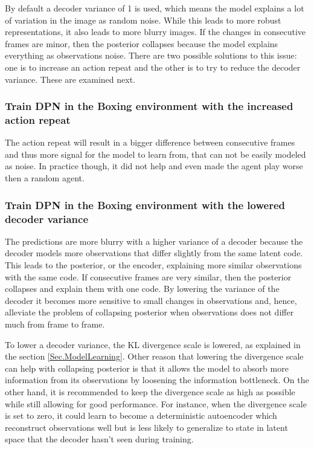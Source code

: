 By default a decoder variance of 1 is used, which means the model explains a lot of variation in the image as random noise. While this leads to more robust representations, it also leads to more blurry images. If the changes in consecutive frames are minor, then the posterior collapses because the model explains everything as observations noise. There are two possible solutions to this issue: one is to increase an action repeat and the other is to try to reduce the decoder variance. These are examined next.

\subsubsection{Train DPN in the Boxing environment with the increased action repeat}

The action repeat will result in a bigger difference between consecutive frames and thus more signal for the model to learn from, that can not be easily modeled as noise. In practice though, it did not help and even made the agent play worse then a random agent.

\subsubsection{Train DPN in the Boxing environment with the lowered decoder variance}

The predictions are more blurry with a higher variance of a decoder because the decoder models more observations that differ slightly from the same latent code. This leads to the posterior, or the encoder, explaining more similar observations with the same code. If consecutive frames are very similar, then the posterior collapses and explain them with one code. By lowering the variance of the decoder it becomes more sensitive to small changes in observations and, hence, alleviate the problem of collapsing posterior when observations does not differ much from frame to frame.

To lower a decoder variance, the KL divergence scale is lowered, as explained in the section \ref{Sec.ModelLearning}. Other reason that lowering the divergence scale can help with collapsing posterior is that it allows the model to absorb more information from its observations by loosening the information bottleneck. On the other hand, it is recommended to keep the divergence scale as high as possible while still allowing for good performance. For instance, when the divergence scale is set to zero, it could learn to become a deterministic autoencoder which reconstruct observations well but is less likely to generalize to state in latent space that the decoder hasn't seen during training.

